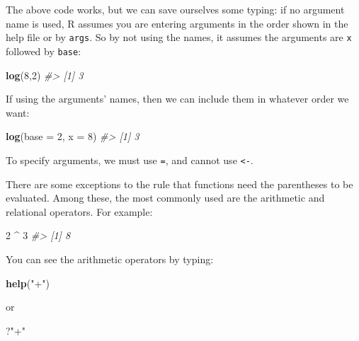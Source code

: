 \documentclass[
]{krantz}
\newenvironment{Shaded}{\begin{snugshade}}{\end{snugshade}}
\newcommand{\CommentTok}[1]{\textcolor[rgb]{0.37,0.37,0.37}{\textit{#1}}}
\newcommand{\DataTypeTok}[1]{\textcolor[rgb]{0.27,0.27,0.27}{#1}}
\newcommand{\DecValTok}[1]{\textcolor[rgb]{0.06,0.06,0.06}{#1}}
\newcommand{\KeywordTok}[1]{\textcolor[rgb]{0.27,0.27,0.27}{\textbf{#1}}}
\newcommand{\NormalTok}[1]{#1}
\newcommand{\OperatorTok}[1]{\textcolor[rgb]{0.43,0.43,0.43}{\textbf{#1}}}
\newcommand{\StringTok}[1]{\textcolor[rgb]{0.5,0.5,0.5}{#1}}
\begin{document}
The above code works, but we can save ourselves some typing: if no argument name is used, R assumes you are entering arguments in the order shown in the help file or by \texttt{args}. So by not using the names, it assumes the arguments are \texttt{x} followed by \texttt{base}:

\begin{Shaded}
\begin{Highlighting}[]
\KeywordTok{log}\NormalTok{(}\DecValTok{8}\NormalTok{,}\DecValTok{2}\NormalTok{)}
\CommentTok{#> [1] 3}
\end{Highlighting}
\end{Shaded}

If using the arguments' names, then we can include them in whatever order we want:

\begin{Shaded}
\begin{Highlighting}[]
\KeywordTok{log}\NormalTok{(}\DataTypeTok{base =} \DecValTok{2}\NormalTok{, }\DataTypeTok{x =} \DecValTok{8}\NormalTok{)}
\CommentTok{#> [1] 3}
\end{Highlighting}
\end{Shaded}

To specify arguments, we must use \texttt{=}, and cannot use \texttt{\textless{}-}.

There are some exceptions to the rule that functions need the parentheses to be evaluated. Among these, the most commonly used are the arithmetic and relational operators. For example:

\begin{Shaded}
\begin{Highlighting}[]
\DecValTok{2} \OperatorTok{^}\StringTok{ }\DecValTok{3}
\CommentTok{#> [1] 8}
\end{Highlighting}
\end{Shaded}

You can see the arithmetic operators by typing:

\begin{Shaded}
\begin{Highlighting}[]
\KeywordTok{help}\NormalTok{(}\StringTok{"+"}\NormalTok{) }
\end{Highlighting}
\end{Shaded}

or

\begin{Shaded}
\begin{Highlighting}[]
\NormalTok{?}\StringTok{"+"}
\end{Highlighting}
\end{Shaded}
\end{document}
